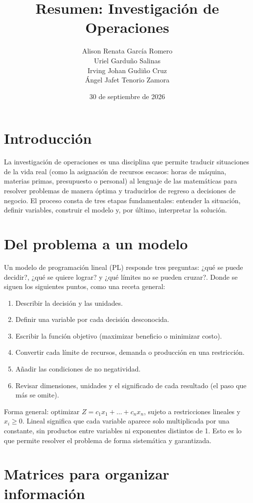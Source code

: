 \documentclass{article}
\title{Resumen: Investigación de Operaciones}
\author{
    Alison Renata García Romero \\
    Uriel Garduño Salinas \\
    Irving Johan Gudiño Cruz \\
    Ángel Jafet Tenorio Zamora
}
\date{30 de septiembre de 2026}
\begin{document}
\maketitle

\section{Introducción}
La investigación de operaciones es una disciplina que permite traducir situaciones de la vida real (como la asignación de recursos escasos: horas de máquina, materias primas, presupuesto o personal) al lenguaje de las matemáticas para resolver problemas de manera óptima y traducirlos de regreso a decisiones de negocio. El proceso consta de tres etapas fundamentales: entender la situación, definir variables, construir el modelo y, por último, interpretar la solución.

\section{Del problema a un modelo}
Un modelo de programación lineal (PL) responde tres preguntas: ¿qué se puede decidir?, ¿qué se quiere lograr? y ¿qué límites no se pueden cruzar?. Donde se siguen los siguientes puntos, como una receta general:
\begin{enumerate}
    \item Describir la decisión y las unidades.
    \item Definir una variable por cada decisión desconocida.
    \item Escribir la función objetivo (maximizar beneficio o minimizar costo).
    \item Convertir cada límite de recursos, demanda o producción en una restricción.
    \item Añadir las condiciones de no negatividad.
    \item Revisar dimensiones, unidades y el significado de cada resultado (el paso que más se omite).
\end{enumerate}

Forma general: optimizar $Z = c_1 x_1 + \dots + c_n x_n$, sujeto a restricciones lineales y $x_i \ge 0$. Lineal significa que cada variable aparece solo multiplicada por una constante, sin productos entre variables ni exponentes distintos de 1. Esto es lo que permite resolver el problema de forma sistemática y garantizada.

\section{Matrices para organizar información}
\end{document}
